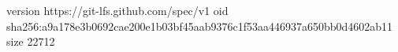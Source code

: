 version https://git-lfs.github.com/spec/v1
oid sha256:a9a178e3b0692cae200e1b03bf45aab9376c1f53aa446937a650bb0d4602ab11
size 22712
